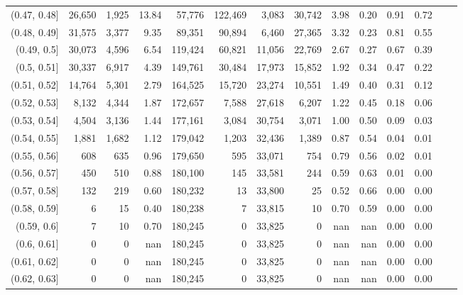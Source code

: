 \begin{tabular}{rrrrrrrrrrrrrr}
(0.47, 0.48]   &  26,650 &  1,925 &   13.84 &   57,776 &  122,469 &   3,083 &  30,742 &  3.98 &  0.20 &  0.91 &      0.72 \\
(0.48, 0.49]   &  31,575 &  3,377 &    9.35 &   89,351 &   90,894 &   6,460 &  27,365 &  3.32 &  0.23 &  0.81 &      0.55 \\
(0.49, 0.5]    &  30,073 &  4,596 &    6.54 &  119,424 &   60,821 &  11,056 &  22,769 &  2.67 &  0.27 &  0.67 &      0.39 \\
(0.5, 0.51]    &  30,337 &  6,917 &    4.39 &  149,761 &   30,484 &  17,973 &  15,852 &  1.92 &  0.34 &  0.47 &      0.22 \\
(0.51, 0.52]   &  14,764 &  5,301 &    2.79 &  164,525 &   15,720 &  23,274 &  10,551 &  1.49 &  0.40 &  0.31 &      0.12 \\
(0.52, 0.53]   &   8,132 &  4,344 &    1.87 &  172,657 &    7,588 &  27,618 &   6,207 &  1.22 &  0.45 &  0.18 &      0.06 \\
(0.53, 0.54]   &   4,504 &  3,136 &    1.44 &  177,161 &    3,084 &  30,754 &   3,071 &  1.00 &  0.50 &  0.09 &      0.03 \\
(0.54, 0.55]   &   1,881 &  1,682 &    1.12 &  179,042 &    1,203 &  32,436 &   1,389 &  0.87 &  0.54 &  0.04 &      0.01 \\
(0.55, 0.56]   &     608 &    635 &    0.96 &  179,650 &      595 &  33,071 &     754 &  0.79 &  0.56 &  0.02 &      0.01 \\
(0.56, 0.57]   &     450 &    510 &    0.88 &  180,100 &      145 &  33,581 &     244 &  0.59 &  0.63 &  0.01 &      0.00 \\
(0.57, 0.58]   &     132 &    219 &    0.60 &  180,232 &       13 &  33,800 &      25 &  0.52 &  0.66 &  0.00 &      0.00 \\
(0.58, 0.59]   &       6 &     15 &    0.40 &  180,238 &        7 &  33,815 &      10 &  0.70 &  0.59 &  0.00 &      0.00 \\
(0.59, 0.6]    &       7 &     10 &    0.70 &  180,245 &        0 &  33,825 &       0 &   nan &   nan &  0.00 &      0.00 \\
(0.6, 0.61]    &       0 &      0 &     nan &  180,245 &        0 &  33,825 &       0 &   nan &   nan &  0.00 &      0.00 \\
(0.61, 0.62]   &       0 &      0 &     nan &  180,245 &        0 &  33,825 &       0 &   nan &   nan &  0.00 &      0.00 \\
(0.62, 0.63]   &       0 &      0 &     nan &  180,245 &        0 &  33,825 &       0 &   nan &   nan &  0.00 &      0.00 \\

\end{tabular}
